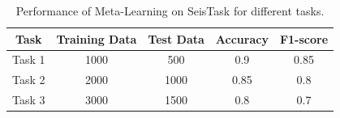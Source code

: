 \documentclass{article}
\begin{document}
\begin{table}[h!]
\centering
\begin{tabular}{|c|c|c|c|c|}
\hline
\textbf{Task} & \textbf{Training Data} & \textbf{Test Data} & \textbf{Accuracy} & \textbf{F1-score} \\
\hline
Task 1 & 1000 & 500 & 0.9 & 0.85 \\
\hline
Task 2 & 2000 & 1000 & 0.85 & 0.8 \\
\hline
Task 3 & 3000 & 1500 & 0.8 & 0.7 \\
\hline
\end{tabular}
\caption{Performance of Meta-Learning on SeisTask for different tasks.}
\label{tab:task_performance}
\end{table}
\end{document}
